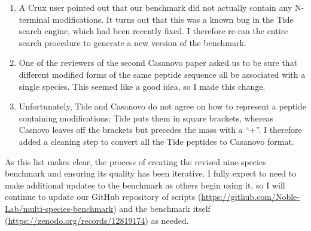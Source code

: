 \documentclass{article}
\begin{document}
\begin{enumerate}
\item A Crux user pointed out that our benchmark did not actually contain any N-terminal modifications.
  It turns out that this was a known bug in the Tide search engine, which had been recently fixed.
  I therefore re-ran the entire search procedure to generate a new version of the benchmark.
\item One of the reviewers of the second Casanovo paper asked us to be sure that different modified forms of the same peptide sequence all be associated with a single species.
  This seemed like a good idea, so I made this change.
\item Unfortunately, Tide and Casanovo do not agree on how to represent a peptide containing modifications: Tide puts them in square brackets, whereas Casnovo leaves off the brackets but precedes the mass with a ``+''.
  I therefore added a cleaning step to convert all the Tide peptides to Casanovo format.
\end{enumerate}

As this list makes clear, the process of creating the revised nine-species benchmark and ensuring its quality has been iterative.
I fully expect to need to make additional updates to the benchmark as others begin using it, so I will continue to update our GitHub repository of scripts (\url{https://github.com/Noble-Lab/multi-species-benchmark}) and the benchmark itself (\url{https://zenodo.org/records/12819174}) as needed.


\end{document}
